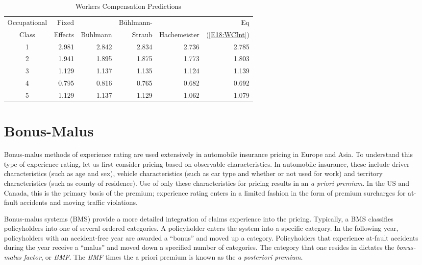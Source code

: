 \begin{table}[h]
 \caption{\label{T18:WorkersCompCredEstimates}
Workers Compensation Predictions}
\begin{tabular}{crrrrr}\hline
Occupational & Fixed &             &B\"{u}hlmann-& &            Eq \\
Class   & Effects    & B\"{u}hlmann& Straub & Hachemeister  & (\ref{E18:WCInt}) \\
\hline \hline
         1 &      2.981 &      2.842 &      2.834 &      2.736 &      2.785 \\
         2 &      1.941 &      1.895 &      1.875 &      1.773 &      1.803 \\
         3 &      1.129 &      1.137 &      1.135 &      1.124 &      1.139 \\
         4 &      0.795 &      0.816 &      0.765 &      0.682 &      0.692 \\
         5 &      1.129 &      1.137 &      1.129 &      1.062 &      1.079 \\
\hline
\end{tabular}
\end{table}

\linejed

\section{Bonus-Malus}\label{S18:Bonus-Malus}

Bonus-malus methods of experience rating are used extensively in
automobile insurance pricing in Europe and Asia. To understand this
type of experience rating, let us first consider pricing based on
observable characteristics. In automobile insurance, these include
driver characteristics (such as age and sex), vehicle
characteristics (such as car type and whether or not used for work)
and territory characteristics (such as county of residence). Use of
only these characteristics for pricing results in an \emph{a priori
premium}. In the US and Canada, this is the primary basis of the
premium; experience rating enters in a limited fashion in the form
of premium surcharges for at-fault accidents and moving traffic
violations.

Bonus-malus systems (BMS) provide a more detailed integration of
claims experience into the pricing. Typically, a BMS classifies
policyholders into one of several ordered categories. A policyholder
enters the system into a specific category. In the following year,
policyholders with an accident-free year are awarded a ``bonus'' and
moved up a category. Policyholders that experience at-fault
accidents during the year receive a ``malus'' and moved down a
specified number of categories. The category that one resides in
dictates the \textit{bonus-malus factor}, or \textit{BMF}. The
\emph{BMF} times the a priori premium is known as the \emph{a
posteriori premium}.

